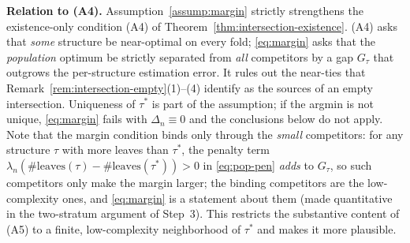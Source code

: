 \noindent\textbf{Relation to (A4).}
Assumption~\ref{assump:margin} strictly strengthens the existence-only condition
(A4) of Theorem~\ref{thm:intersection-existence}. (A4) asks that \emph{some}
structure be near-optimal on every fold; \eqref{eq:margin} asks that the
\emph{population} optimum be strictly separated from \emph{all} competitors by a
gap $G_\tau$ that outgrows the per-structure estimation error. It rules out the
near-ties that Remark~\ref{rem:intersection-empty}(1)--(4) identify as the
sources of an empty intersection. Uniqueness of $\tau^\ast$ is part of the
assumption; if the argmin is not unique, \eqref{eq:margin} fails with
$\Delta_n\equiv 0$ and the conclusions below do not apply. Note that the margin
condition binds only through the \emph{small} competitors: for any structure
$\tau$ with more leaves than $\tau^\ast$, the penalty term
$\lambda_n(\#\mathrm{leaves}(\tau)-\#\mathrm{leaves}(\tau^\ast))>0$ in
\eqref{eq:pop-pen} \emph{adds} to $G_\tau$, so such competitors only make the
margin larger; the binding competitors are the low-complexity ones, and
\eqref{eq:margin} is a statement about them (made quantitative in the two-stratum
argument of Step~3). This restricts the substantive content of (A5) to a finite,
low-complexity neighborhood of $\tau^\ast$ and makes it more plausible.

